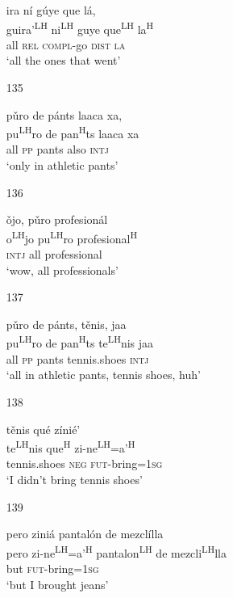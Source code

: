 \begin{itemize}
\glll   ira n\'{i} g\'{u}ye que l\'{a},\\
  guira'\textsuperscript{LH} ni\textsuperscript{LH} guye que\textsuperscript{LH} la\textsuperscript{H} \\
all \textsc{rel} \textsc{compl}-go \textsc{dist} \textsc{la}\\
\glt `all the ones that went'



\item[135]
 
\glll   p\v{u}ro de p\'{a}nts laaca xa, \\ 
 pu\textsuperscript{LH}ro de pan\textsuperscript{H}ts laaca xa\\
all \textsc{pp} pants also \textsc{intj}\\
\glt `only in athletic pants'




\item[136]
 
\glll   \v{o}jo, p\v{u}ro profesion\'{a}l\\
 o\textsuperscript{LH}jo pu\textsuperscript{LH}ro profesional\textsuperscript{H} \\
\textsc{intj} all professional\\
\glt `wow, all professionals'




\item[137]
 
\glll   p\v{u}ro de p\'{a}nts, t\v{e}nis, jaa\\
 pu\textsuperscript{LH}ro de pan\textsuperscript{H}ts te\textsuperscript{LH}nis jaa\\
  all \textsc{pp} pants tennis.shoes \textsc{intj}\\
\glt `all in athletic pants, tennis shoes, huh'
 


\item[138]
 
\glll   t\v{e}nis qu\'{e} z\'{i}ni\'{e}' \\
 te\textsuperscript{LH}nis  que\textsuperscript{H} zi-ne\textsuperscript{LH}=a'\textsuperscript{H} \\
tennis.shoes \textsc{neg} \textsc{fut}-bring=\textsc{1sg}\\
\glt `I didn't bring tennis shoes'
 


\item[139]
 
\glll  pero zini\'{a} pantal\'{o}n de mezcl\'{i}lla\\
pero zi-ne\textsuperscript{LH}=a'\textsuperscript{H} pantalon\textsuperscript{LH} de mezcli\textsuperscript{LH}lla\\
but \textsc{fut}-bring=\textsc{1sg}\\
\glt `but I brought jeans'
 



\end{itemize}
